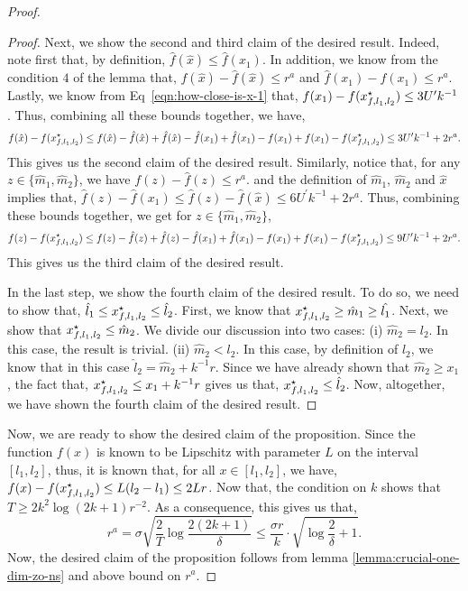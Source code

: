 \begin{proof}
\begin{proof}
Next, we show the second and third claim of the desired result. Indeed, 
note first that, by definition, $\hat{f}(\hat{x}) \leq \hat{f}(x_1)$. In addition, 
we know from the condition $4$ of the lemma that, $f(\hat{x}) - \hat{f}(\hat{x}) \leq r^a$ 
and $\hat{f}(x_1) - f(x_1) \leq r^a$. Lastly, we know from Eq~\eqref{eqn:how-close-is-x-1}
that, $f(x_1) - f(x_{f, l_1, l_2}^\star) \leq 3U^\prime k^{-1}$. Thus, combining 
all these bounds together, we have, 
\begin{equation*}
f(\hat{x}) - f(x_{f, l_1, l_2}^\star) \leq 
	f(\hat{x}) - \hat{f}(\hat{x})
	+ \hat{f}(\hat{x}) -\hat{f}(x_1)
	+ \hat{f}(x_1) - f(x_1)
	+ f(x_1) - f(x_{f, l_1, l_2}^\star)
		\leq 3U^\prime k^{-1} + 2r^a. 
\end{equation*}
This gives us the second claim of the desired result. Similarly, notice that, 
for any $z \in \{\hat{m}_1, \hat{m}_2\}$, we have $f(z) - \hat{f}(z) \leq r^a$. 
and the definition of $\hat{m}_1$, $\hat{m}_2$ and $\hat{x}$ implies that, 
$\hat{f}(z) - \hat{f}(x_1) \leq \hat{f}(z) - \hat{f}(\hat{x}) \leq 6U^\prime k^{-1} + 2r^a$.
Thus, combining these bounds together, we get for $z\in \{\hat{m}_1, \hat{m}_2\}$, 
\begin{equation*}
f(z) - f(x_{f, l_1, l_2}^\star) \leq 
	f(z) - \hat{f}(z)
	+ \hat{f}(z) -\hat{f}(x_1)
	+ \hat{f}(x_1) - f(x_1)
	+ f(x_1) - f(x_{f, l_1, l_2}^\star)
		\leq 9U^\prime k^{-1} + 2r^a. 
\end{equation*}
This gives us the third claim of the desired result.

In the last step, we show the fourth claim of the desired result. To do so, we 
need to show that, $\hat{l}_1 \leq x_{f, l_1, l_2}^\star \leq \hat{l}_2$. First, 
we know that $x_{f, l_1, l_2}^\star \geq \hat{m}_1 \geq \hat{l_1}$. Next, 
we show that $x_{f, l_1, l_2}^\star \leq \hat{m}_2$. We divide our discussion 
into two cases: (i) $\hat{m}_2 = l_2$. In this case, the result is trivial. 
(ii) $\hat{m}_2 < l_2$. In this case, by definition of $\hat{l}_2$, we know 
that in this case $\hat{l}_2 = \hat{m}_2 + k^{-1} r$. Since we have already 
shown that $\hat{m}_2 \geq x_1$, the fact that, $x_{f, l_1, l_2}^\star 
\leq x_1 + k^{-1}r$ gives us that, $x_{f, l_1, l_2}^\star  \leq \hat{l}_2$.  
Now, altogether, we have shown the fourth claim of the desired result. 
\end{proof}

Now, we are ready to show the desired claim of the proposition. Since 
the function $f(x)$ is known to be Lipschitz with parameter $L$ on the 
interval $[l_1, l_2]$, thus, it is known that, for all $x \in [l_1, l_2]$, we have, 
$f(x) - f(x_{f, l_1, l_2}^\star) \leq L(l_2 - l_1) \leq 2Lr$. Now that, the 
condition on $k$ shows that $T \geq 2k^2 \log(2k+1) r^{-2}$. As a consequence,
this gives us that, 
\begin{equation*}
r^a = \sigma \sqrt{\frac{2}{T}\log \frac{2(2k+1)}{\delta}} 
	\leq \frac{\sigma r}{k} \cdot \sqrt{\log \frac{2}{\delta} + 1}.
\end{equation*}
Now, the desired claim of the proposition follows from lemma 
\ref{lemma:crucial-one-dim-zo-ns} and above bound on $r^a$. 
\end{proof}

